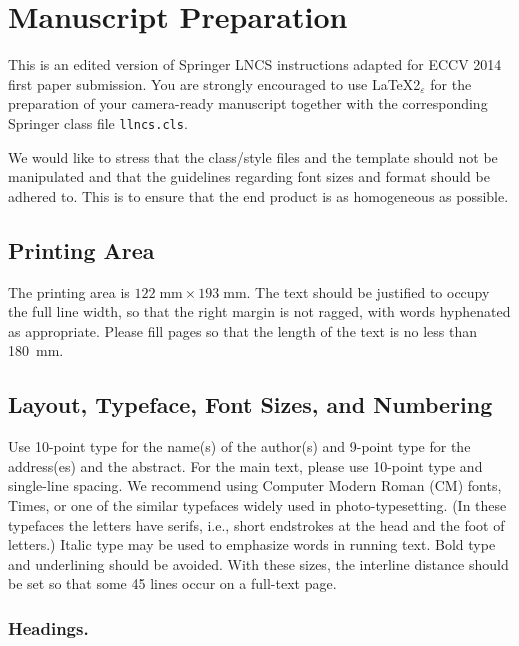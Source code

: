 \documentclass[runningheads]{llncs}
\begin{document}
\section{Manuscript Preparation}

This is an edited version of Springer LNCS instructions adapted
for ECCV 2014 first paper submission.
You are strongly encouraged to use \LaTeX2$_\varepsilon$ for the
preparation of your
camera-ready manuscript together with the corresponding Springer
class file \verb+llncs.cls+.

We would like to stress that the class/style files and the template
should not be manipulated and that the guidelines regarding font sizes
and format should be adhered to. This is to ensure that the end product
is as homogeneous as possible.

\subsection{Printing Area}
The printing area is $122  \; \mbox{mm} \times 193 \;
\mbox{mm}$.
The text should be justified to occupy the full line width,
so that the right margin is not ragged, with words hyphenated as
appropriate. Please fill pages so that the length of the text
is no less than 180~mm.

\subsection{Layout, Typeface, Font Sizes, and Numbering}
Use 10-point type for the name(s) of the author(s) and 9-point type for
the address(es) and the abstract. For the main text, please use 10-point
type and single-line spacing.
We recommend using Computer Modern Roman (CM) fonts, Times, or one
of the similar typefaces widely used in photo-typesetting.
(In these typefaces the letters have serifs, i.e., short endstrokes at
the head and the foot of letters.)
Italic type may be used to emphasize words in running text. Bold
type and underlining should be avoided.
With these sizes, the interline distance should be set so that some 45
lines occur on a full-text page.

\subsubsection{Headings.}
\end{document}
